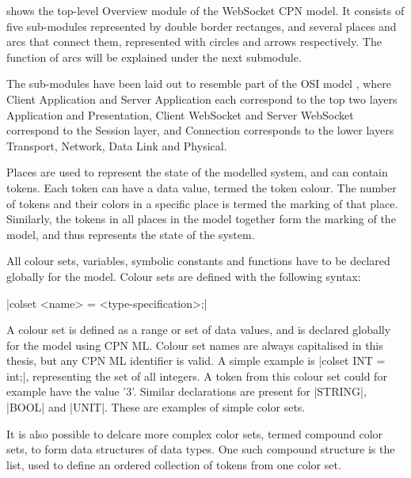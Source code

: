 	
	 shows the top-level Overview module of the
	WebSocket CPN model. It consists of five sub-modules represented by double
	border rectanges, and several places and arcs that connect them, represented
	with circles and arrows respectively. The function of arcs will be explained
	under the next submodule.
	
	The sub-modules have been laid out to resemble part of the OSI model
	\cite{osi7}, where Client Application and Server Application each correspond to
	the top two layers Application and Presentation, Client WebSocket and Server
	WebSocket correspond to the Session layer, and Connection corresponds to the
	lower layers Transport, Network, Data Link and Physical.
	
	Places are used to represent the state of the modelled system, and can contain
	tokens. Each token can have a data value, termed the token colour. The number
	of tokens and their colors in a specific place is termed the marking of that
	place. Similarly, the tokens in all places in the model together form the 
	marking of the model, and thus represents the state of the system.
	
	
	All colour sets, variables, symbolic constants and functions have to be
	declared globally for the model. Colour sets are defined with the following syntax:
	
	|colset <name> = <type-specification>;|
	
	A colour set is defined as a range or set of data
	values, and is declared globally for the model using CPN ML. Colour set names
	are always capitalised in this thesis, but any CPN ML identifier is valid. A
	simple example is |colset INT = int;|, representing the set of all integers. A
	token from this colour set could for example have the value '3'. Similar
	declarations are present for |STRING|, |BOOL| and |UNIT|.
	These are examples of simple color sets. 
	
	It is also possible to delcare more complex color sets, termed compound color
	sets, to form data structures of data types. One such compound structure is the
	list, used to define an ordered collection of tokens from one color set.
	
